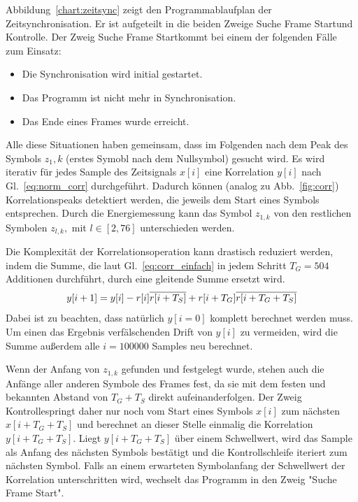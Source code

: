 Abbildung~\ref{chart:zeitsync} zeigt den Programmablaufplan der Zeitsynchronisation. Er ist aufgeteilt in die beiden Zweige \dq Suche Frame Start\dq und \dq Kontrolle\dq. Der Zweig \dq Suche Frame Start\q kommt bei einem der folgenden Fälle zum Einsatz:
\begin{itemize}
\item Die Synchronisation wird initial gestartet.
\item Das Programm ist nicht mehr in Synchronisation.
\item Das Ende eines Frames wurde erreicht.
\end{itemize}
Alle diese Situationen haben gemeinsam, dass im Folgenden nach dem Peak des Symbols $z_1,k$ (erstes Symobl nach dem Nullsymbol) gesucht wird. Es wird iterativ für jedes Sample des Zeitsignals $x[i]$ eine Korrelation $y[i]$ nach Gl.~\ref{eq:norm_corr} durchgeführt. Dadurch können (analog zu Abb.~\ref{fig:corr}) Korrelationspeaks detektiert werden, die jeweils dem Start eines Symbols entsprechen. Durch die Energiemessung kann das Symbol $z_{1,k}$ von den restlichen Symbolen $z_{l,k},$ mit  $l \in [2,76]$ unterschieden werden.

Die Komplexität der Korrelationsoperation kann drastisch reduziert werden, indem die Summe, die laut Gl.~\ref{eq:corr_einfach} in jedem Schritt $T_G = 504$ Additionen durchführt, durch eine gleitende Summe ersetzt wird.
\begin{equation}
    y[i+1] = y[i] - r[i] \overline{r[i+T_S]} + r[i+T_G] \overline{r[i+T_G+T_S]}
    \label{eq:moving_sum}
\end{equation}
Dabei ist zu beachten, dass natürlich $y[i=0]$ komplett berechnet werden muss. Um einen das Ergebnis verfälschenden Drift von $y[i]$ zu vermeiden, wird die Summe außerdem alle $i=100000$ Samples neu berechnet.

Wenn der Anfang von $z_{1,k}$ gefunden und festgelegt wurde, stehen auch die Anfänge aller anderen Symbole des Frames fest, da sie mit dem festen und bekannten Abstand von $T_G+T_S$ direkt aufeinanderfolgen. Der Zweig \dq Kontrolle\dq springt daher nur noch vom Start eines Symbols $x[i]$ zum nächsten $x[i+T_G+T_S]$ und berechnet an dieser Stelle einmalig die Korrelation $y[i+T_G+T_S]$. Liegt $y[i+T_G+T_S]$ über einem Schwellwert, wird das Sample als Anfang des nächsten Symbols bestätigt und die Kontrollschleife iteriert zum nächsten Symbol. Falls an einem erwarteten Symbolanfang der Schwellwert der Korrelation unterschritten wird, wechselt das Programm in den Zweig "Suche Frame Start".

